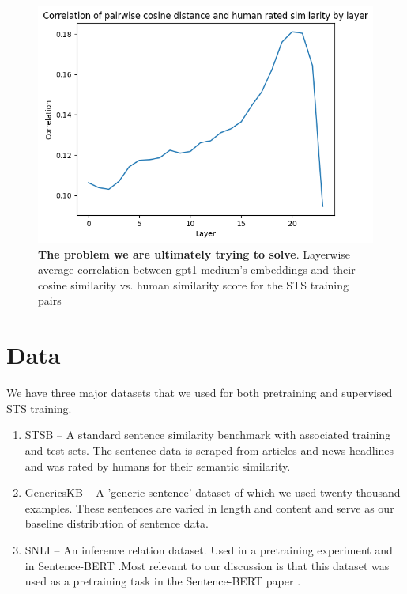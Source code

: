 \documentclass{article}
\begin{document}
\begin{figure}[!htb]
    \centering
    \includegraphics[width=0.65\linewidth]{raw_cosine_sim.png}
    \caption{\textbf{The problem we are ultimately trying to solve}. Layerwise average correlation between gpt1-medium's embeddings and their cosine similarity vs. human similarity score for the STS training pairs}
    \label{fig:raw-corr}
\end{figure}    


\section{Data}
We have three major datasets that we used for both pretraining and supervised STS training.
\begin{enumerate}
    \item STSB \cite{STS} -- A standard sentence similarity benchmark with associated training and test sets. The sentence data is scraped from articles and news headlines and was rated by humans for their semantic similarity.

    \item GenericsKB \cite{bhakthavatsalam2020genericskbknowledgebasegeneric} -- A 'generic sentence' dataset of which we used twenty-thousand examples. These sentences are varied in length and content and serve as our baseline distribution of sentence data.

    \item SNLI \cite{snli} -- An inference relation dataset. Used in a pretraining experiment and in Sentence-BERT \cite{reimers2019sentencebertsentenceembeddingsusing}.Most relevant to our discussion is that this dataset was used as a pretraining task in the Sentence-BERT paper \cite{reimers2019sentencebertsentenceembeddingsusing}.
\end{enumerate}
\end{document}
